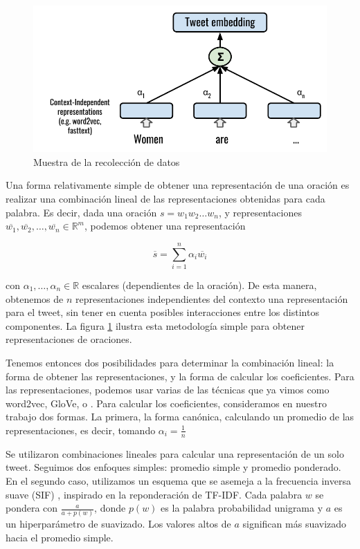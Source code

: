 \begin{figure}[t]
    \centering
    \includegraphics[width=\textwidth]{img/tweet_embeddings.pdf}
    \caption{Muestra de la recolección de datos}
    \label{fig:tweet_embeddings}
\end{figure}

Una forma relativamente simple de obtener una representación de una oración es realizar una combinación lineal de las representaciones obtenidas para cada palabra. Es decir, dada una oración $s = w_1 w_2 \ldots w_n$, y representaciones $\overline{w_1}, \overline{w_2}, \ldots, \overline{w_n} \in \mathbb{R}^m$, podemos obtener una representación

\begin{equation}
    \overline{s} = \sum\limits_{i=1}^{n} \alpha_i \overline{w_i}
\end{equation}

con $\alpha_1, \ldots, \alpha_n \in \mathbb{R}$ escalares (dependientes de la oración). De esta manera, obtenemos de $n$ representaciones independientes del contexto una representación para el tweet, sin tener en cuenta posibles interacciones entre los distintos componentes. La figura \ref{fig:tweet_embeddings} ilustra esta metodología simple para obtener representaciones de oraciones.

Tenemos entonces dos posibilidades para determinar la combinación lineal: la forma de obtener las representaciones, y la forma de calcular los coeficientes. Para las representaciones, podemos usar varias de las técnicas que ya vimos como word2vec, GloVe, o \fasttext{}. Para calcular los coeficientes, consideramos en nuestro trabajo dos formas. La primera, la forma canónica, calculando un promedio de las representaciones, es decir, tomando $\alpha_i = \frac{1}{n}$

Se utilizaron combinaciones lineales para calcular una representación de un solo tweet.
Seguimos dos enfoques simples: promedio simple y promedio ponderado. En el segundo caso, utilizamos un esquema que se asemeja a la frecuencia inversa suave (SIF) \cite {arora17}, inspirado en la reponderación de TF-IDF.
Cada palabra $ w $ se pondera con $ \frac {a} {a + p (w)} $, donde $ p (w) $ es la palabra probabilidad unigrama y $ a $ es un hiperparámetro de suavizado.
Los valores altos de $ a $ significan más suavizado hacia el promedio simple.

